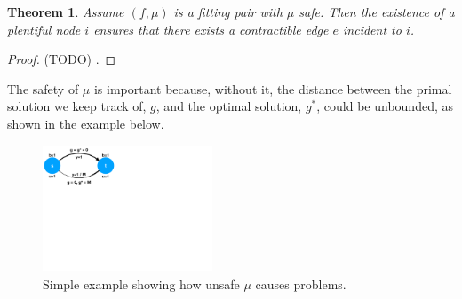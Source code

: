 \documentclass[11pt]{article}
\newtheorem{theorem}{Theorem}[section]
\theoremstyle{definition}
\theoremstyle{definition}
\newcommand{\rewrite}[1]{#1}%
\newcommand{\todo}[1]{}%
\begin{document}
    \begin{theorem} Assume $(f, \mu)$ is a fitting pair with $\mu$ safe.
    Then the existence of a plentiful node $i$ ensures
    that there exists a contractible edge $e$ incident to $i$.
    \end{theorem}
    \begin{proof} (TODO)
    \todo{Prove theorem 3.1 more succinctly and clearly}.
    \end{proof}

    \rewrite{The safety of $\mu$ is important because, without it, the distance between
    the primal solution we keep track of, $g$, and the optimal solution, $g^*$, could
    be unbounded, as shown in the example below.} \todo{Describe.}

    \begin{figure}[h]
    \centering
    \includegraphics[width=0.45\textwidth]{figs/unsafe.pdf}
    \caption{
    \label{fig:unsafe}
    \rewrite{Simple example showing how unsafe $\mu$ causes problems.}\todo{Keep?}
    }
    \end{figure}
\end{document}
